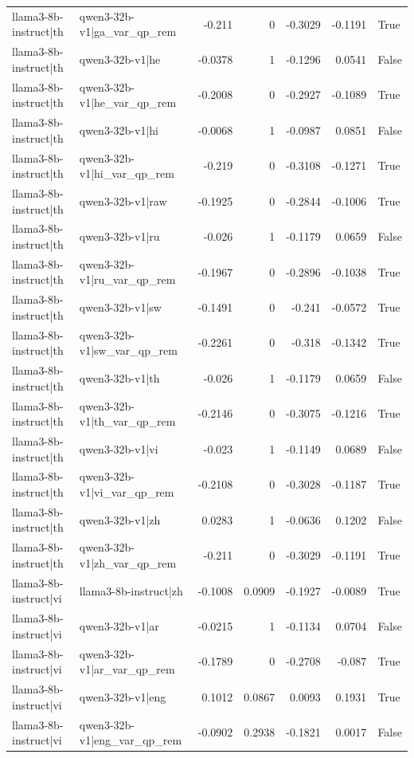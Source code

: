 \begin{table}
\begin{tabular}{l l r r r r l}
llama3-8b-instruct|th & qwen3-32b-v1|ga_var_qp_rem & -0.211 & 0 & -0.3029 & -0.1191 & True \\
llama3-8b-instruct|th & qwen3-32b-v1|he & -0.0378 & 1 & -0.1296 & 0.0541 & False \\
llama3-8b-instruct|th & qwen3-32b-v1|he_var_qp_rem & -0.2008 & 0 & -0.2927 & -0.1089 & True \\
llama3-8b-instruct|th & qwen3-32b-v1|hi & -0.0068 & 1 & -0.0987 & 0.0851 & False \\
llama3-8b-instruct|th & qwen3-32b-v1|hi_var_qp_rem & -0.219 & 0 & -0.3108 & -0.1271 & True \\
llama3-8b-instruct|th & qwen3-32b-v1|raw & -0.1925 & 0 & -0.2844 & -0.1006 & True \\
llama3-8b-instruct|th & qwen3-32b-v1|ru & -0.026 & 1 & -0.1179 & 0.0659 & False \\
llama3-8b-instruct|th & qwen3-32b-v1|ru_var_qp_rem & -0.1967 & 0 & -0.2896 & -0.1038 & True \\
llama3-8b-instruct|th & qwen3-32b-v1|sw & -0.1491 & 0 & -0.241 & -0.0572 & True \\
llama3-8b-instruct|th & qwen3-32b-v1|sw_var_qp_rem & -0.2261 & 0 & -0.318 & -0.1342 & True \\
llama3-8b-instruct|th & qwen3-32b-v1|th & -0.026 & 1 & -0.1179 & 0.0659 & False \\
llama3-8b-instruct|th & qwen3-32b-v1|th_var_qp_rem & -0.2146 & 0 & -0.3075 & -0.1216 & True \\
llama3-8b-instruct|th & qwen3-32b-v1|vi & -0.023 & 1 & -0.1149 & 0.0689 & False \\
llama3-8b-instruct|th & qwen3-32b-v1|vi_var_qp_rem & -0.2108 & 0 & -0.3028 & -0.1187 & True \\
llama3-8b-instruct|th & qwen3-32b-v1|zh & 0.0283 & 1 & -0.0636 & 0.1202 & False \\
llama3-8b-instruct|th & qwen3-32b-v1|zh_var_qp_rem & -0.211 & 0 & -0.3029 & -0.1191 & True \\
llama3-8b-instruct|vi & llama3-8b-instruct|zh & -0.1008 & 0.0909 & -0.1927 & -0.0089 & True \\
llama3-8b-instruct|vi & qwen3-32b-v1|ar & -0.0215 & 1 & -0.1134 & 0.0704 & False \\
llama3-8b-instruct|vi & qwen3-32b-v1|ar_var_qp_rem & -0.1789 & 0 & -0.2708 & -0.087 & True \\
llama3-8b-instruct|vi & qwen3-32b-v1|eng & 0.1012 & 0.0867 & 0.0093 & 0.1931 & True \\
llama3-8b-instruct|vi & qwen3-32b-v1|eng_var_qp_rem & -0.0902 & 0.2938 & -0.1821 & 0.0017 & False \\

\end{tabular}
\end{table}
